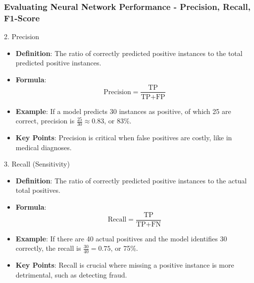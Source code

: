 \documentclass[aspectratio=169]{beamer}
\begin{document}
\begin{frame}[fragile]
    \frametitle{Evaluating Neural Network Performance - Precision, Recall, F1-Score}
    \begin{block}{2. Precision}
        \begin{itemize}
            \item \textbf{Definition}: The ratio of correctly predicted positive instances to the total predicted positive instances.
            \item \textbf{Formula}:
            \begin{equation}
                \text{Precision} = \frac{\text{TP}}{\text{TP} + \text{FP}}
            \end{equation}
            \item \textbf{Example}: If a model predicts 30 instances as positive, of which 25 are correct, precision is \(\frac{25}{30} \approx 0.83\), or 83\%.
            \item \textbf{Key Points}: Precision is critical when false positives are costly, like in medical diagnoses.
        \end{itemize}
    \end{block}

    \begin{block}{3. Recall (Sensitivity)}
        \begin{itemize}
            \item \textbf{Definition}: The ratio of correctly predicted positive instances to the actual total positives.
            \item \textbf{Formula}:
            \begin{equation}
                \text{Recall} = \frac{\text{TP}}{\text{TP} + \text{FN}}
            \end{equation}
            \item \textbf{Example}: If there are 40 actual positives and the model identifies 30 correctly, the recall is \(\frac{30}{40} = 0.75\), or 75\%.
            \item \textbf{Key Points}: Recall is crucial where missing a positive instance is more detrimental, such as detecting fraud.
        \end{itemize}
    \end{block}


\end{frame}
\end{document}
